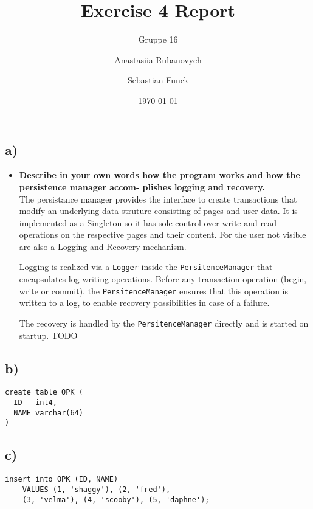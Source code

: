 \documentclass[a4paper,english,abstract=on]{scrartcl}
\title{Exercise 4 Report}
\subtitle{Gruppe 16}
\author{Anastasiia Rubanovych\and Sebastian Funck}
\date{\today}
\begin{document}
\maketitle

\subsection*{a)}
\begin{itemize}
	\item \textbf{Describe in your own words how the program works and how the persistence manager accom-
		plishes logging and recovery.}\\
	
	The persistance manager provides the interface to create transactions that modify an underlying data struture consisting of pages and user data. It is implemented as a Singleton so it has sole control over write and read operations on the respective pages and their content. For the user not visible are also a Logging and Recovery mechanism. 
	
	Logging is realized via a \texttt{Logger} inside the \texttt{PersitenceManager} that encapsulates log-writing operations. Before any transaction operation (begin, write or commit), the \texttt{PersitenceManager} ensures that this operation is written to a log, to enable recovery possibilities in case of a failure.
	
	The recovery is handled by the  \texttt{PersitenceManager} directly and is started on startup. TODO
\end{itemize}

\subsection*{b)}
\begin{lstlisting}
create table OPK (
  ID   int4,
  NAME varchar(64)
)
\end{lstlisting}

\subsection*{c)}
\begin{lstlisting}
insert into OPK (ID, NAME) 	
    VALUES (1, 'shaggy'), (2, 'fred'),
    (3, 'velma'), (4, 'scooby'), (5, 'daphne');
\end{lstlisting}
\end{document}
